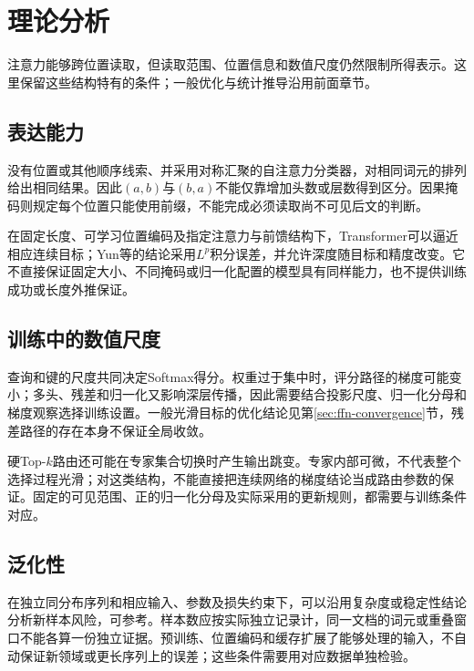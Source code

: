\section{理论分析}
\label{sec:transformer-theory}

注意力能够跨位置读取，但读取范围、位置信息和数值尺度仍然限制所得表示。这里保留这些结构特有的条件；一般优化与统计推导沿用前面章节。

\subsection{表达能力}
\label{sec:transformer-expressivity}

没有位置或其他顺序线索、并采用对称汇聚的自注意力分类器，对相同词元的排列给出相同结果。因此$(a,b)$与$(b,a)$不能仅靠增加头数或层数得到区分。因果掩码则规定每个位置只能使用前缀，不能完成必须读取尚不可见后文的判断。

在固定长度、可学习位置编码及指定注意力与前馈结构下，Transformer可以逼近相应连续目标；Yun等的结论采用$L^p$积分误差，并允许深度随目标和精度改变。它不直接保证固定大小、不同掩码或归一化配置的模型具有同样能力，也不提供训练成功或长度外推保证。

\subsection{训练中的数值尺度}
\label{sec:transformer-convergence}

查询和键的尺度共同决定Softmax得分。权重过于集中时，评分路径的梯度可能变小；多头、残差和归一化又影响深层传播，因此需要结合投影尺度、归一化分母和梯度观察选择训练设置。一般光滑目标的优化结论见第\ref{sec:ffn-convergence}节，残差路径的存在本身不保证全局收敛。

硬Top-$k$路由还可能在专家集合切换时产生输出跳变。专家内部可微，不代表整个选择过程光滑；对这类结构，不能直接把连续网络的梯度结论当成路由参数的保证。固定的可见范围、正的归一化分母及实际采用的更新规则，都需要与训练条件对应。

\subsection{泛化性}
\label{sec:transformer-model-generalization}

在独立同分布序列和相应输入、参数及损失约束下，可以沿用复杂度或稳定性结论分析新样本风险，可参考。样本数应按实际独立记录计，同一文档的词元或重叠窗口不能各算一份独立证据。预训练、位置编码和缓存扩展了能够处理的输入，不自动保证新领域或更长序列上的误差；这些条件需要用对应数据单独检验。

